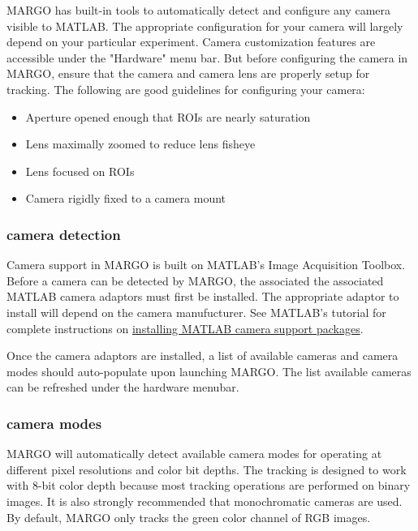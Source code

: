 \documentclass[11pt]{article}
\begin{document}
MARGO has built-in tools to automatically detect and configure any camera visible to MATLAB. The appropriate configuration for your camera will largely depend on your particular experiment. Camera customization features are accessible under the "Hardware" menu bar. But before configuring the camera in MARGO, ensure that the camera and camera lens are properly setup for tracking. The following are good guidelines for configuring your camera:

\begin{itemize}
	\itemsep0em 
	\item Aperture opened enough that ROIs are nearly saturation
	\item Lens maximally zoomed to reduce lens fisheye
	\item Lens focused on ROIs
	\item Camera rigidly fixed to a camera mount
\end{itemize} 

\hypertarget{camdetect}{\subsubsection{camera detection}}

Camera support in MARGO is built on MATLAB's Image Acquisition Toolbox. Before a camera can be detected by MARGO, the associated the associated MATLAB camera adaptors must first be installed. The appropriate adaptor to install will depend on the camera manufucturer. See MATLAB's tutorial for complete instructions on \href{https://www.mathworks.com/help/imaq/installing-the-support-packages-for-image-acquisition-toolbox-adaptors.html}{installing MATLAB camera support packages}.

Once the camera adaptors are installed, a list of available cameras and camera modes should auto-populate upon launching MARGO. The list available cameras can be refreshed under the hardware menubar. 

\hypertarget{cammodes}{\subsubsection{camera modes}}

MARGO will automatically detect available camera modes for operating at different pixel resolutions and color bit depths. The tracking is designed to work with 8-bit color depth because most tracking operations are performed on binary images. It is also strongly recommended that monochromatic cameras are used. By default, MARGO only tracks the green color channel of RGB images.
\end{document}

